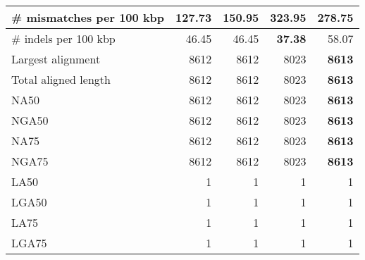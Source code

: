 \documentclass[12pt,a4paper]{article}
\begin{document}
\begin{table}[ht]
\begin{center}
\begin{tabular}{|l*{4}{|r}|}
\# mismatches per 100 kbp & {\bf 127.73} & 150.95 & 323.95 & 278.75 \\ \hline
\# indels per 100 kbp & 46.45 & 46.45 & {\bf 37.38} & 58.07 \\ \hline
Largest alignment & 8612 & 8612 & 8023 & {\bf 8613} \\ \hline
Total aligned length & 8612 & 8612 & 8023 & {\bf 8613} \\ \hline
NA50 & 8612 & 8612 & 8023 & {\bf 8613} \\ \hline
NGA50 & 8612 & 8612 & 8023 & {\bf 8613} \\ \hline
NA75 & 8612 & 8612 & 8023 & {\bf 8613} \\ \hline
NGA75 & 8612 & 8612 & 8023 & {\bf 8613} \\ \hline
LA50 & 1 & 1 & 1 & 1 \\ \hline
LGA50 & 1 & 1 & 1 & 1 \\ \hline
LA75 & 1 & 1 & 1 & 1 \\ \hline
LGA75 & 1 & 1 & 1 & 1 \\ \hline
\end{tabular}
\end{center}
\end{table}
\end{document}
